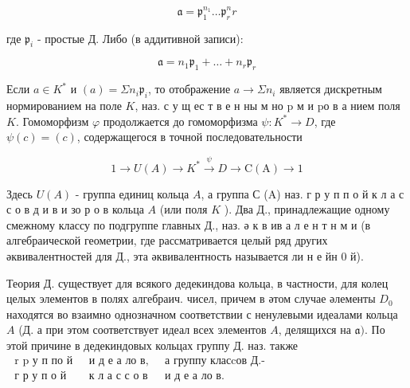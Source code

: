 \documentclass[10pt]{article}
\begin{document}
\[

\mathfrak{a}=\mathfrak{p}_{1}^{n_{1}} \ldots \mathfrak{p}_{r}^{n} r

\]



где $\mathfrak{p}_{i}$ - простые Д. Либо (в аддитивной записи):



\[

\mathfrak{a}=n_{1} \mathfrak{p}_{1}+\ldots+n_{r} \mathfrak{p}_{r}

\]



Если $a \in K^{*}$ и $(a)=\Sigma n_{i} \mathfrak{p}_{i}$, то отображение $a \rightarrow \Sigma n_{i}$ является дискретным нормированием на поле $K$, наз. с у щ ес т в е н ны м но $\mathrm{p}$ м и $\mathrm{p} о$ в а нием поля $K$. Гомоморфизм $\varphi$ продолжается до гомоморфизма $\psi: K^{*} \rightarrow D$, где $\psi(c)=(c)$, содержащегося в точной последовательности



\[

1 \longrightarrow U(A) \rightarrow K^{*} \stackrel{\psi}{\longrightarrow} D \longrightarrow \mathrm{C}(\mathrm{A}) \longrightarrow 1

\]



Здесь $U(A)$ - группа единиц кольца $A$, а группа С (A) наз. г р у п п о й к л а с с о в д и в и зо р о в кольца $A$ (или поля $K$ ). Два Д., принадлежащие одному смежному классу по подгруппе главных Д., наз. ә к в ив а л е н т н м и (в алгебраической геометрии, где рассматривается целый ряд других әквивалентностей для Д., эта әквивалентность называется ли н е йн 0 й).



Теория Д. существует для всякого дедекиндова кольца, в частности, для колец целых элементов в полях алгебраич. чисел, причем в әтом случае әлементы $D_{0}$ находятся во взаимно однозначном соответствии с ненулевыми идеалами кольца $A$ (Д. а при этом соответствует идеал всех элементов $A$, делящихся на $\mathfrak{a})$. По этой причине в дедекиндовых кольцах группу Д. наз. также $\begin{array}{lllll}\text { r p у п по й } & \text { и д е а ло в, } & \text { а группу класcов Д.- } \\ \text { г р у п о й } & \text { к л а с с о в } & \text { и д е а ло в. }\end{array}$
\end{document}
